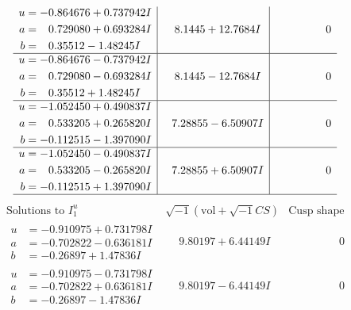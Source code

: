 \documentclass[1p]{elsarticle_modified}
\theoremstyle{definition}
\newcommand{\I}{\sqrt{-1}}
\begin{document}
$$\begin{array}{c|c|c}
\begin{aligned}
u &= -0.864676 + 0.737942 I \\
a &= \phantom{-}0.729080 + 0.693284 I \\
b &= \phantom{-}0.35512 - 1.48245 I\end{aligned}
 & \phantom{-}8.1445 + 12.7684 I & \phantom{-0.000000 } 0 \\ \hline\begin{aligned}
u &= -0.864676 - 0.737942 I \\
a &= \phantom{-}0.729080 - 0.693284 I \\
b &= \phantom{-}0.35512 + 1.48245 I\end{aligned}
 & \phantom{-}8.1445 - 12.7684 I & \phantom{-0.000000 } 0 \\ \hline\begin{aligned}
u &= -1.052450 + 0.490837 I \\
a &= \phantom{-}0.533205 + 0.265820 I \\
b &= -0.112515 - 1.397090 I\end{aligned}
 & \phantom{-}7.28855 - 6.50907 I & \phantom{-0.000000 } 0 \\ \hline\begin{aligned}
u &= -1.052450 - 0.490837 I \\
a &= \phantom{-}0.533205 - 0.265820 I \\
b &= -0.112515 + 1.397090 I\end{aligned}
 & \phantom{-}7.28855 + 6.50907 I & \phantom{-0.000000 } 0\\
 \hline 
 \end{array}$$\newpage$$\begin{array}{c|c|c}  
\text{Solutions to }I^u_{1}& \I (\text{vol} + \sqrt{-1}CS) & \text{Cusp shape}\\
 \hline 
\begin{aligned}
u &= -0.910975 + 0.731798 I \\
a &= -0.702822 - 0.636181 I \\
b &= -0.26897 + 1.47836 I\end{aligned}
 & \phantom{-}9.80197 + 6.44149 I & \phantom{-0.000000 } 0 \\ \hline\begin{aligned}
u &= -0.910975 - 0.731798 I \\
a &= -0.702822 + 0.636181 I \\
b &= -0.26897 - 1.47836 I\end{aligned}
 & \phantom{-}9.80197 - 6.44149 I & \phantom{-0.000000 } 0 \\ \hline\begin{aligned}

\end{aligned}
\end{array}$$
\end{document}
